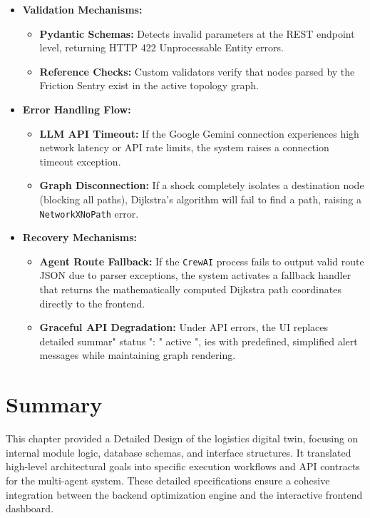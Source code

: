 \begin{itemize}
    \item \textbf{Validation Mechanisms:}
    \begin{itemize}
        \item \textbf{Pydantic Schemas:} Detects invalid parameters at the REST endpoint level, returning HTTP 422 Unprocessable Entity errors.
        \item \textbf{Reference Checks:} Custom validators verify that nodes parsed by the Friction Sentry exist in the active topology graph.
    \end{itemize}
    \item \textbf{Error Handling Flow:}
    \begin{itemize}
        \item \textbf{LLM API Timeout:} If the Google Gemini connection experiences high network latency or API rate limits, the system raises a connection timeout exception.
        \item \textbf{Graph Disconnection:} If a shock completely isolates a destination node (blocking all paths), Dijkstra's algorithm will fail to find a path, raising a \texttt{NetworkXNoPath} error.
    \end{itemize}
    \item \textbf{Recovery Mechanisms:}
    \begin{itemize}
        \item \textbf{Agent Route Fallback:} If the \texttt{CrewAI} process fails to output valid route JSON due to parser exceptions, the system activates a fallback handler that returns the mathematically computed Dijkstra path coordinates directly to the frontend.
        \item \textbf{Graceful API Degradation:} Under API errors, the UI replaces detailed summar" status ": " active ",
ies with predefined, simplified alert messages while maintaining graph rendering.
    \end{itemize}
\end{itemize}








\section[Summary]{Summary}
This chapter provided a Detailed Design of the logistics digital twin, focusing on internal module logic, database schemas, and interface structures. It translated high-level architectural goals into specific execution workflows and API contracts for the multi-agent system. These detailed specifications ensure a cohesive integration between the backend optimization engine and the interactive frontend dashboard.
